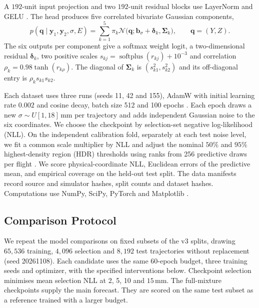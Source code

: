 \documentclass[11pt,a4paper]{article}
\begin{document}
A $192$-unit input projection and two $192$-unit residual blocks use LayerNorm and GELU \cite{layernorm2016,gelu2016}. The head produces five correlated bivariate Gaussian components,
\begin{equation}
  p(\mathbf q\mid\mathbf y_1,\mathbf y_2,\sigma,E)
    = \sum_{k=1}^{5} \pi_k
       \mathcal N\bigl(\mathbf q;\mathbf b_\sigma+\boldsymbol\delta_k,
                        \boldsymbol\Sigma_k\bigr),\qquad
       \mathbf q=(Y,Z).
  \label{eq:mixture}
\end{equation}
The six outputs per component give a softmax weight logit, a two-dimensional residual $\boldsymbol\delta_k$, two positive scales $s_{kj}=\operatorname{softplus}(r_{kj})+10^{-3}$ and correlation $\rho_k=0.98\tanh(r_{k\rho})$. The diagonal of $\boldsymbol\Sigma_k$ is $(s_{k1}^2,s_{k2}^2)$ and its off-diagonal entry is $\rho_k s_{k1}s_{k2}$.

Each dataset uses three runs (seeds 11, 42 and 155), AdamW with initial learning rate $0.002$ and cosine decay, batch size 512 and 100 epochs \cite{loshchilov2019}. Each epoch draws a new $\sigma\sim U[1,18]\,\mathrm{mm}$ per trajectory and adds independent Gaussian noise to the six coordinates. We choose the checkpoint by selection-set negative log-likelihood (NLL). On the independent calibration fold, separately at each test noise level, we fit a common scale multiplier by NLL and adjust the nominal $50\%$ and $95\%$ highest-density region (HDR) thresholds using ranks from 256 predictive draws per flight \cite{hyndman1996,hpdsplit2022}. We score physical-coordinate NLL, Euclidean errors of the predictive mean, and empirical coverage on the held-out test split. The data manifests record source and simulator hashes, split counts and dataset hashes. Computations use NumPy, SciPy, PyTorch and Matplotlib \cite{harris2020,virtanen2020,paszke2019,hunter2007}.

\subsection{Comparison Protocol}
\label{sec:protocol}

We repeat the model comparisons on fixed subsets of the v3 splits, drawing $65{,}536$ training, $4{,}096$ selection and $8{,}192$ test trajectories without replacement (seed 20261108). Each candidate uses the same 60-epoch budget, three training seeds and optimizer, with the specified interventions below. Checkpoint selection minimises mean selection NLL at 2, 5, 10 and $15\,\mathrm{mm}$. The full-mixture checkpoints supply the main forecast. They are scored on the same test subset as a reference trained with a larger budget.
\end{document}
